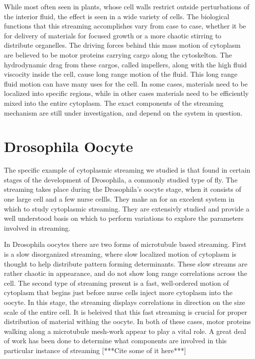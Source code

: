 \documentclass[11pt]{ucthesis}
\begin{document}
While most often seen in plants, whose cell walls restrict outside perturbations of the interior fluid, the effect is seen in a wide variety of cells. 
The biological functions that this streaming accomplishes vary from case to case, whether it be for delivery of materials for focused growth or a more chaotic stirring to distribute organelles.
The driving forces behind this mass motion of cytoplasm are believed to be motor proteins carrying cargo along the cytoskelton.
The hydrodynamic drag from these cargos, called impellers, along with the high fluid viscocity inside the cell, cause long range motion of the fluid.
This long range fluid motion can have many uses for the cell.
In some cases, materials need to be localized into specific regions, while in other cases materials need to be efficiently mixed into the entire cytoplasm.
The exact components of the streaming mechanism are still under investigation, and depend on the system in question.

\section{Drosophila Oocyte}
The specific example of cytoplasmic streaming we studied is that found in certain stages of the development of Drosophila, a commonly studied type of fly.
The streaming takes place during the Drosophila's oocyte stage, when it consists of one large cell and a few nurse cellls.
They make an for an excelent system in which to study cytoplasmic streaming.
They are extensivly studied and provide a well understood basis on which to perform variations to explore the parameters involved in streaming.

In Drosophila oocytes there are two forms of microtubule based streaming. 
First is a slow disorganized streaming, where slow localized motion of cytoplasm is thought to help distribute pattern forming determinants. 
These slow streams are rather chaotic in appearance, and do not show long range correlations across the cell.
The second type of streaming present is a fast, well-ordered motion of cytoplasm that begins just before nurse cells inject more cytoplasm into the oocyte. 
In this stage, the streaming displays correlations in direction on the size scale of the entire cell. It is beleived that this fast streaming is crucial for proper distribution of material withing the oocyte.
In both of these cases, motor proteins walking along a microtubule mesh-work appear to play a vital role. 
A great deal of work has been done to determine what components are involved in this particular instance of streaming [***Cite some of it here***]
\end{document}
